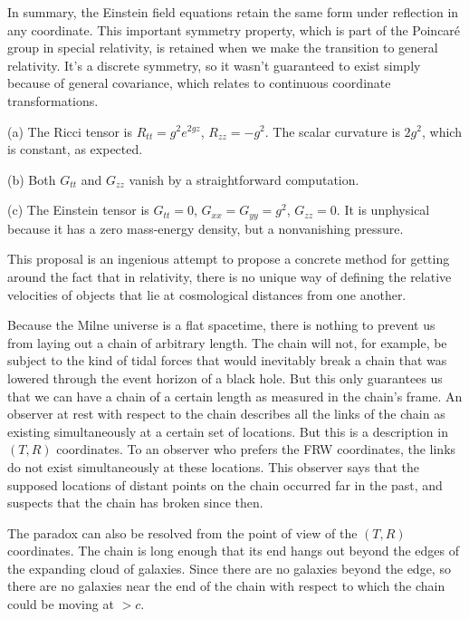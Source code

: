 In summary, the Einstein field equations retain the same form under reflection in any coordinate. This
important symmetry property, which is part of the  Poincar\'{e} group in special relativity,
is retained when we make the transition to general relativity. It's a discrete symmetry, so it wasn't guaranteed
to exist simply because of general covariance, which relates to continuous coordinate transformations.


(a) The Ricci tensor is $R_{tt}=g^2e^{2gz}$, $R_{zz}=-g^2$. The scalar curvature is $2g^2$, which is constant, as expected.

(b) Both $G_{tt}$ and $G_{zz}$ vanish by a straightforward computation.

(c) The Einstein tensor is $G_{tt}=0$, $G_{xx}=G_{yy}=g^2$, $G_{zz}=0$. It is unphysical because it has a zero mass-energy density,
but a nonvanishing pressure.


This proposal is an ingenious attempt to propose a concrete method for getting around the fact that in relativity,
there is no unique way of defining the relative velocities of objects that lie at cosmological distances from one
another.

Because the Milne universe is a flat spacetime, there is nothing to prevent us from laying out a chain
of arbitrary length. The chain will not, for example, be subject to the kind of tidal forces that
would inevitably break a chain that was lowered through the event horizon of a black hole. But this
only guarantees us that we can have a chain of a certain length as measured in the chain's frame.
An observer at rest with respect to the chain describes all the links of the chain as existing
simultaneously at a certain set of locations. But this is a description in $(T,R)$ coordinates.
To an observer who prefers the FRW coordinates, the links do not exist simultaneously at these
locations. This observer says that the supposed locations of distant points on the chain occurred far in
the past, and suspects that the chain has broken since then.

The paradox can also be resolved from the point of view of the $(T,R)$ coordinates. The chain is
long enough that its end hangs out beyond the edges of the expanding cloud of galaxies. Since there are no galaxies beyond
the edge, so there are no galaxies near the end of the chain with respect to which the chain could be moving at $>c$.

